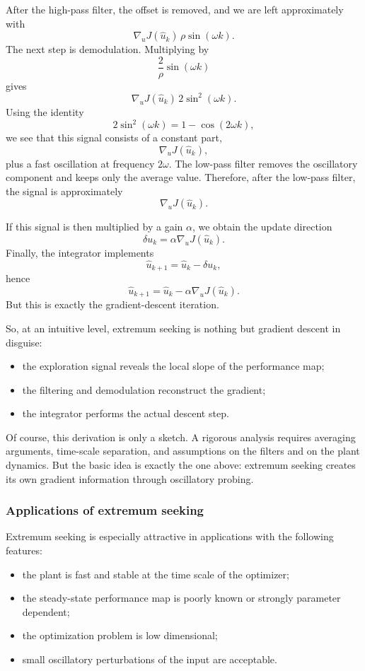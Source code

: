 After the high-pass filter, the offset is removed, and we are left approximately with
\[
\nabla_u J(\hat u_k)\,\rho \sin(\omega k).
\]
The next step is demodulation. Multiplying by
\[
\frac{2}{\rho}\sin(\omega k)
\]
gives
\[
\nabla_u J(\hat u_k)\, 2\sin^2(\omega k).
\]
Using the identity
\[
2\sin^2(\omega k)=1-\cos(2\omega k),
\]
we see that this signal consists of a constant part,
\[
\nabla_u J(\hat u_k),
\]
plus a fast oscillation at frequency $2\omega$. The low-pass filter removes the oscillatory component and keeps only the average value. Therefore, after the low-pass filter, the signal is approximately
\[
\nabla_u J(\hat u_k).
\]

If this signal is then multiplied by a gain $\alpha$, we obtain the update direction
\[
\delta u_k=\alpha \nabla_u J(\hat u_k).
\]
Finally, the integrator implements
\[
\hat u_{k+1}=\hat u_k-\delta u_k,
\]
hence
\[
\hat u_{k+1}=\hat u_k-\alpha \nabla_u J(\hat u_k).
\]
But this is exactly the gradient-descent iteration.

So, at an intuitive level, extremum seeking is nothing but gradient descent in disguise:
\begin{itemize}
    \item the exploration signal reveals the local slope of the performance map;
    \item the filtering and demodulation reconstruct the gradient;
    \item the integrator performs the actual descent step.
\end{itemize}

Of course, this derivation is only a sketch. A rigorous analysis requires averaging arguments, time-scale separation, and assumptions on the filters and on the plant dynamics. But the basic idea is exactly the one above: extremum seeking creates its own gradient information through oscillatory probing.

\subsubsection{Applications of extremum seeking}

Extremum seeking is especially attractive in applications with the following features:
\begin{itemize}
    \item the plant is fast and stable at the time scale of the optimizer;
    \item the steady-state performance map is poorly known or strongly parameter dependent;
    \item the optimization problem is low dimensional;
    \item small oscillatory perturbations of the input are acceptable.
\end{itemize}

